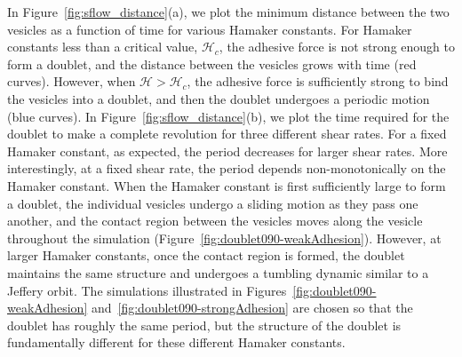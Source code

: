 \documentclass[prf,superscriptaddress,showkeys]{revtex4-1}
\begin{document}
In Figure~\ref{fig:sflow_distance}(a), we plot the minimum distance
between the two vesicles as a function of time for various Hamaker
constants.  For Hamaker constants less than a critical value,
$\mathcal{H}_c$, the adhesive force is not strong enough to form a
doublet, and the distance between the vesicles grows with time (red
curves).  However, when $\mathcal{H} > \mathcal{H}_c$, the adhesive
force is sufficiently strong to bind the vesicles into a doublet, and
then the doublet undergoes a periodic motion (blue curves).  In
Figure~\ref{fig:sflow_distance}(b), we plot the time required for the
doublet to make a complete revolution for three different shear rates.
For a fixed Hamaker constant, as expected, the period decreases for
larger shear rates.  More interestingly, at a fixed shear rate, the
period depends non-monotonically on the Hamaker constant.  When the
Hamaker constant is first sufficiently large to form a doublet, the
individual vesicles undergo a sliding motion as they pass one another,
and the contact region between the vesicles moves along the vesicle
throughout the simulation (Figure~\ref{fig:doublet090-weakAdhesion}).
However, at larger Hamaker constants, once the contact region is formed,
the doublet maintains the same structure and undergoes a tumbling
dynamic similar to a Jeffery orbit.  The simulations illustrated in
Figures~\ref{fig:doublet090-weakAdhesion}
and~\ref{fig:doublet090-strongAdhesion} are chosen so that the doublet
has roughly the same period, but the structure of the doublet is
fundamentally different for these different Hamaker constants.
\end{document}
